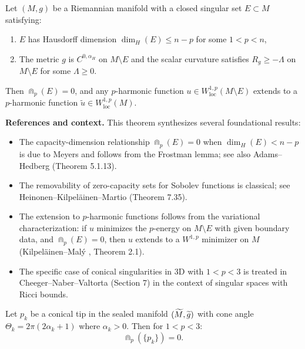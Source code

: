 \begin{theorem}\label{thm:CapacityRemovability}
Let $(M, g)$ be a Riemannian manifold with a closed singular set $E \subset M$ satisfying:
\begin{enumerate}
    \item $E$ has Hausdorff dimension $\dim_H(E) \le n - p$ for some $1 < p < n$,
    \item The metric $g$ is $C^{0,\alpha_H}$ on $M \setminus E$ and the scalar curvature satisfies $R_g \ge -\Lambda$ on $M \setminus E$ for some $\Lambda \ge 0$.
\end{enumerate}
Then $\Cap_p(E) = 0$, and any $p$-harmonic function $u \in W^{1,p}_{\mathrm{loc}}(M \setminus E)$ extends to a $p$-harmonic function $\tilde{u} \in W^{1,p}_{\mathrm{loc}}(M)$.

\textbf{References and context.} This theorem synthesizes several foundational results:
\begin{itemize}
    \item The capacity-dimension relationship $\Cap_p(E) = 0$ when $\dim_H(E) < n - p$ is due to Meyers \cite{meyers1970} and follows from the Frostman lemma; see also Adams--Hedberg \cite{adamshedberg1996} (Theorem 5.1.13).
    \item The removability of zero-capacity sets for Sobolev functions is classical; see Heinonen--Kilpel\"ainen--Martio \cite{hkm1993} (Theorem 7.35).
    \item The extension to $p$-harmonic functions follows from the variational characterization: if $u$ minimizes the $p$-energy on $M \setminus E$ with given boundary data, and $\Cap_p(E) = 0$, then $u$ extends to a $W^{1,p}$ minimizer on $M$ (Kilpel\"ainen--Mal\'y \cite{kilpelainenmaly1992}, Theorem 2.1).
    \item The specific case of conical singularities in 3D with $1 < p < 3$ is treated in Cheeger--Naber--Valtorta \cite{cheegernabervaltorta2015} (Section 7) in the context of singular spaces with Ricci bounds.
\end{itemize}
\end{theorem}

\begin{lemma}\label{lem:ExplicitCapacity}
Let $p_k$ be a conical tip in the sealed manifold $(\widetilde{M}, \widetilde{g})$ with cone angle $\Theta_k = 2\pi(2\alpha_k + 1)$ where $\alpha_k > 0$. Then for $1 < p < 3$:
\begin{equation}
    \Cap_p(\{p_k\}) = 0.
\end{equation}
\end{lemma}

